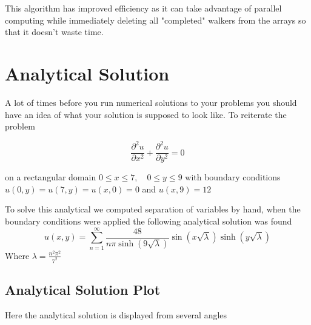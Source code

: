 \documentclass{amsart}
\begin{document}
This algorithm has improved efficiency as it can take advantage of parallel computing while immediately deleting all "completed" walkers from the arrays so that it doesn't waste time.
\section{Analytical Solution}

A lot of times before you run numerical solutions to your problems you should have an idea of what your solution is supposed to look like. To reiterate the problem

	$$\frac{\partial^2 u}{\partial x^2} + \frac{\partial^2 u}{\partial y^2} = 0$$

on a rectangular domain $0 \leq x \leq 7, \quad 0 \leq y \leq 9$ with boundary conditions $u(0,y) = u(7,y) = u(x,0) = 0$ and $u(x,9) = 12$ 

To solve this analytical we computed separation of variables by hand, when the boundary conditions were applied the following analytical solution was found
\begin{equation}
    u(x,y)= \sum _{n=1}^{\infty} \frac{48}{n \pi \sinh(9 \sqrt{\lambda})} \sin(x \sqrt{\lambda}) \sinh(y \sqrt{\lambda})
\end{equation}
Where $\lambda=\frac{n^2 \pi ^2}{7^2}$

\subsection{Analytical Solution Plot} 

Here the analytical solution is displayed from several angles 
\end{document}
